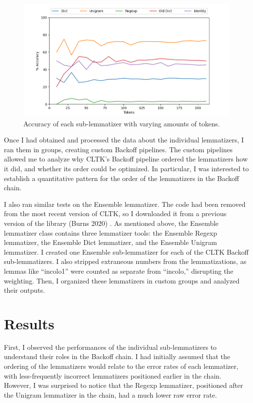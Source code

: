 \documentclass[11pt]{article}
\begin{document}
\begin{figure}
    \centering
    \includegraphics[width=0.5\linewidth]{accuracy_over_time_v3.png}
    \caption{Accuracy of each sub-lemmatizer with varying amounts of tokens.}
    \label{fig:enter-label}
\end{figure}

Once I had obtained and processed the data about the individual lemmatizers, I ran them in groups, creating custom Backoff pipelines. The custom pipelines allowed me to analyze why CLTK’s Backoff pipeline ordered the lemmatizers how it did, and whether its order could be optimized. In particular, I was interested to establish a quantitative pattern for the order of the lemmatizers in the Backoff chain.

I also ran similar tests on the Ensemble lemmatizer. The code had been removed from the most recent version of CLTK, so I downloaded it from a previous version of the library (Burns 2020) \cite{ensemble_add_burns_2020}. As mentioned above, the Ensemble lemmatizer class contains three lemmatizer tools: the Ensemble Regexp lemmatizer, the Ensemble Dict lemmatizer, and the Ensemble Unigram lemmatizer. I created one Ensemble sub-lemmatizer for each of the CLTK Backoff sub-lemmatizers. I also stripped extraneous numbers from the lemmatizations, as lemmas like “incolo1” were counted as separate from “incolo,” disrupting the weighting. Then, I organized these lemmatizers in custom groups and analyzed their outputs.

\section{Results}

First, I observed the performances of the individual sub-lemmatizers to understand their roles in the Backoff chain. I had initially assumed that the ordering of the lemmatizers would relate to the error rates of each lemmatizer, with less-frequently incorrect lemmatizers positioned earlier in the chain. However, I was surprised to notice that the Regexp lemmatizer, positioned after the Unigram lemmatizer in the chain, had a much lower raw error rate. 
\end{document}
